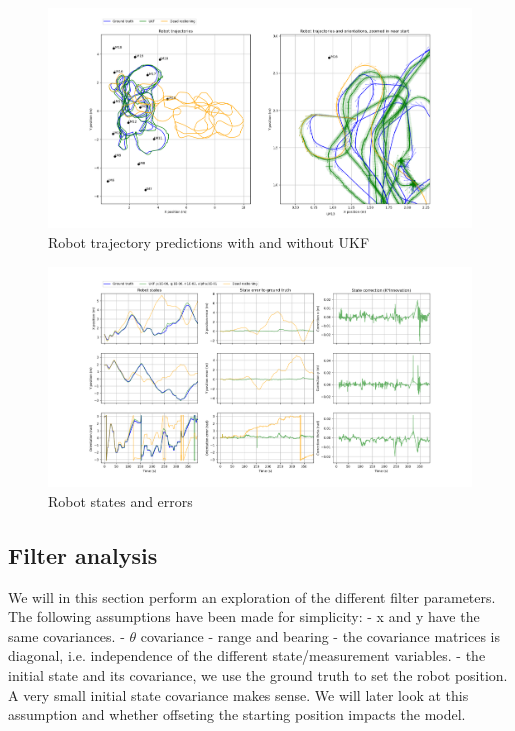 \documentclass{article}
\begin{document}
\begin{figure}
\centering
\includegraphics[width=\textwidth]{Figure_4.png}
\caption{Robot trajectory predictions with and without UKF}
\end{figure}


\begin{figure}
\centering
\includegraphics[width=\textwidth]{Figure_5.png}
\caption{Robot states and errors}
\end{figure}

\subsection{Filter analysis}
We will in this section perform an exploration of the different filter parameters.
The following assumptions have been made for simplicity:
- x and y have the same covariances. 
- $\theta$ covariance
- range and bearing
- the covariance matrices is diagonal, i.e. independence of the different state/measurement variables. 
- the initial state and its covariance, we use the ground truth to set the robot position. A very small initial state covariance makes sense. We will later look at this assumption and whether offseting the starting position impacts the model.
\end{document}
